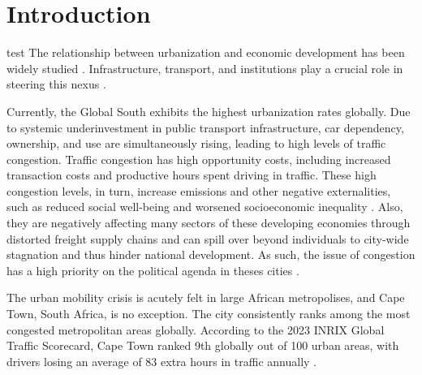 \documentclass[main.tex]{subfiles}
\begin{document}
\section*{Introduction}
test
The relationship between urbanization and economic development has been widely studied \citep{ritchie2018urbanization}. Infrastructure, transport, and institutions play a crucial role in steering this nexus \citep{rodrigue2020geography}.

Currently, the Global South exhibits the highest urbanization rates globally. Due to systemic underinvestment in   public transport infrastructure, car dependency, ownership, and use are simultaneously rising, leading to high levels of traffic congestion. Traffic congestion has high opportunity costs, including increased transaction costs and productive hours spent driving in traffic. These high congestion levels, in turn, increase emissions and other negative externalities, such as reduced social well-being and worsened socioeconomic inequality \citep{Wang2019-ge}. Also, they are negatively affecting many sectors of these developing economies through distorted freight supply chains \citep{jabbarpour2018applications, miskolczi2021urban} and can spill over beyond individuals to city-wide stagnation and thus hinder national development. As such, the issue of congestion has a high priority on the political agenda in theses cities \citep{costa2017urban, miskolczi2021urban, perveen2017evaluating}. 

The urban mobility crisis is acutely felt in large African metropolises, and Cape Town, South Africa, is no exception. The city consistently ranks among the most congested metropolitan areas globally. According to the 2023 INRIX Global Traffic Scorecard, Cape Town ranked 9th globally out of 100 urban areas, with drivers losing an average of 83 extra hours in traffic annually \citep{inrix2023scorecard}.  
\end{document}
